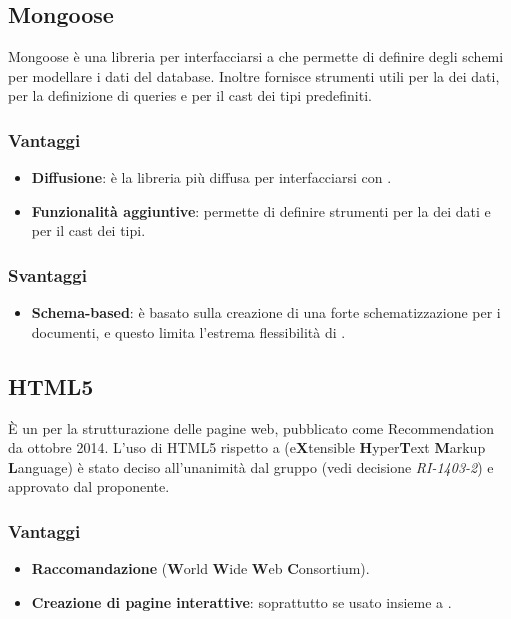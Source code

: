 \subsection{Mongoose}
Mongoose \`e una libreria per interfacciarsi a  che permette di definire degli schemi per modellare i dati del database. Inoltre fornisce strumenti utili per la  dei dati, per la definizione di queries e per il cast dei tipi predefiniti. \\
\subsubsection{Vantaggi}
\begin{itemize}
\item \textbf{Diffusione}: \`e la libreria pi\`u diffusa per interfacciarsi con .
\item \textbf{Funzionalit\`a aggiuntive}: permette di definire strumenti per la  dei dati e per il cast dei tipi.
\end{itemize}
\subsubsection{Svantaggi}
\begin{itemize}
\item \textbf{Schema-based}: \`e basato sulla creazione di una forte schematizzazione per i documenti, e questo limita l'estrema flessibilità di .
\end{itemize}
\subsection{HTML5}
\`E un  per la strutturazione delle pagine web, pubblicato come  Recommendation da ottobre 2014. L'uso di HTML5 rispetto a  (e\textbf{X}tensible \textbf{H}yper\textbf{T}ext \textbf{M}arkup \textbf{L}anguage) \`e stato deciso all'unanimit\`a dal gruppo (vedi decisione \textit{RI-1403-2}) e approvato dal proponente.
\subsubsection{Vantaggi}
\begin{itemize}
\item \textbf{Raccomandazione } (\textbf{W}orld \textbf{W}ide \textbf{W}eb \textbf{C}onsortium).
\item \textbf{Creazione di pagine interattive}: soprattutto se usato insieme a .
\end{itemize}
